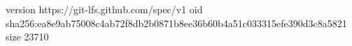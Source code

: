 version https://git-lfs.github.com/spec/v1
oid sha256:ea8e9ab75008c4ab72f8db2b0871b8ee36b60b4a51c033315efe390d3c8a5821
size 23710
